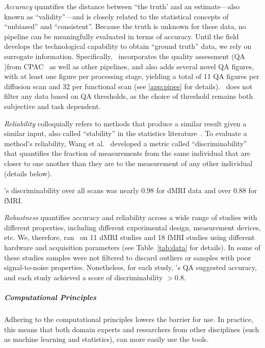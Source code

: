\documentclass[11pt]{article}
\begin{document}
\begin{multicols}{2}
\emph{Accuracy} quantifies the distance between ``the truth' and an estimate---also known as ``validity''---and is closely related to the statistical concepts of ``unbiased'' and ``consistent''.  
Because the truth is unknown for these data, no pipeline can be meaningfully evaluated in terms of accuracy. Until the field develops the technological capability to obtain ``ground truth'' data, we rely on surrogate information. 
Specifically, %
\ndmg~incorporates the quality assessment (QA )from CPAC~\cite{cpac} as well as other pipelines, and also adds several novel QA figures, with at least one figure per processing stage, yielding a total of 11 QA figures per diffusion scan and 32 per functional scan (see \ref{app:pipes} for details). \ndmg~does not filter any data based on QA thresholds, as the choice of threshold remains both subjective and task dependent.

\emph{Reliability} colloquially refers to methods that produce a similar result given a similar input, also called ``stability'' in the statistics literature~\cite{Yu2013}.
To evaluate a method's reliability, Wang et al.~\cite{discriminability} developed a metric  called ``discriminability'' that quantifies the fraction of measurements from the same individual that are closer to one another than they are to the measurement of any other individual (details below). 

\ndmg's discriminability over all scans was nearly $0.98$ for dMRI data and over $0.88$ for fMRI. 

\emph{Robustness} quantifies accuracy and reliability across a wide range of studies with different properties, including different experimental design, measurement devices, etc.  
We, therefore, ran \ndmg~on 11 dMRI studies and 18 fMRI studies using different hardware and acquisition parameters (see Table~\ref{tab:data} for details). In some of these studies samples were not  filtered to discard outliers or samples with poor signal-to-noise properties. Nonetheless, for each study, \ndmg's QA suggested accuracy, and each study achieved a score of discriminability $>0.8$. 

\subparagraph*{Computational Principles}
Adhering to the computational principles lowers the barrier for use. In practice, this means that both domain experts and researchers from other disciplines (such as machine learning and statistics), can more easily use the tools.  


\end{multicols}
\end{document}
